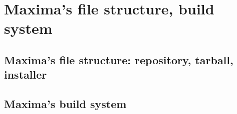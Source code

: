 \documentclass[../Maxima_Workbook.tex]{subfiles}
\begin{document}
	
\part{Maxima's file structure, build system}

\chapter{Maxima's file structure: repository, tarball, installer}

\chapter{Maxima's build system}
\end{document}
